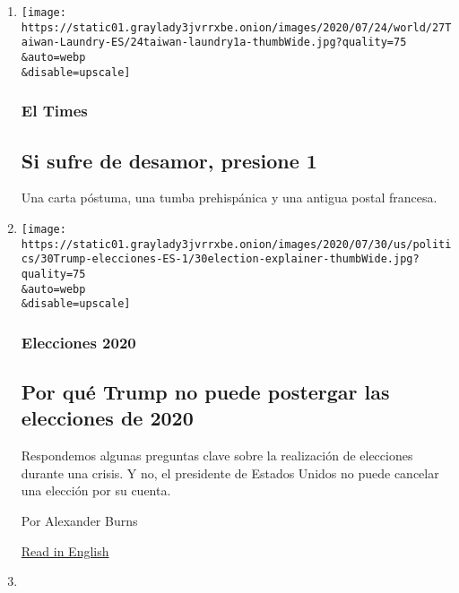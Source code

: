 \begin{enumerate}
\def\labelenumi{\arabic{enumi}.}
\item
  \href{/es/2020/07/31/espanol/elecciones-2020-trump-mexico-violencia.html}{}

  \texttt{[image: https://static01.graylady3jvrrxbe.onion/images/2020/07/24/world/27Taiwan-Laundry-ES/24taiwan-laundry1a-thumbWide.jpg?quality=75\\\&auto=webp\\\&disable=upscale]}

  \hypertarget{el-times}{%
  \subsubsection{El Times}\label{el-times}}

  \hypertarget{si-sufre-de-desamor-presione-1}{%
  \subsection{Si sufre de desamor, presione
  1}\label{si-sufre-de-desamor-presione-1}}

  Una carta póstuma, una tumba prehispánica y una antigua postal
  francesa.
\item
  \href{/es/2020/07/30/espanol/estados-unidos/trump-retrasar-elecciones.html}{}

  \texttt{[image: https://static01.graylady3jvrrxbe.onion/images/2020/07/30/us/politics/30Trump-elecciones-ES-1/30election-explainer-thumbWide.jpg?quality=75\\\&auto=webp\\\&disable=upscale]}

  \hypertarget{elecciones-2020}{%
  \subsubsection{Elecciones 2020}\label{elecciones-2020}}

  \hypertarget{por-quuxe9-trump-no-puede-postergar-las-elecciones-de-2020}{%
  \subsection{Por qué Trump no puede postergar las elecciones de
  2020}\label{por-quuxe9-trump-no-puede-postergar-las-elecciones-de-2020}}

  Respondemos algunas preguntas clave sobre la realización de elecciones
  durante una crisis. Y no, el presidente de Estados Unidos no puede
  cancelar una elección por su cuenta.

  Por Alexander Burns

  \href{https://www.nytimes3xbfgragh.onion/2020/07/30/us/politics/trump-postpone-election.html}{Read
  in English}
\item
  \href{/es/2020/07/29/espanol/estados-unidos/biden-vicepresidente.html}{}


\end{enumerate}
